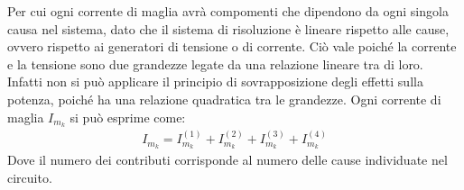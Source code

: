 \documentclass{article}
\numberwithin{equation}{subsection}
\begin{document}
Per cui ogni corrente di maglia avrà compomenti che dipendono da ogni singola causa nel sistema, dato che il sistema di risoluzione è lineare rispetto alle cause, ovvero 
rispetto ai generatori di tensione o di corrente. Ciò vale poiché la corrente e la tensione sono due grandezze legate da una relazione lineare tra di loro. Infatti non si può 
applicare il principio di sovrapposizione degli effetti sulla potenza, poiché ha una relazione quadratica tra le grandezze. Ogni corrente di maglia $I_{m_k}$ si può esprime come:
\begin{gather*}
    I_{m_k}=I_{m_k}^{(1)}+I_{m_k}^{(2)}+I_{m_k}^{(3)}+I_{m_k}^{(4)}
\end{gather*}
Dove il numero dei contributi corrisponde al numero delle cause individuate nel circuito. 
\end{document}
